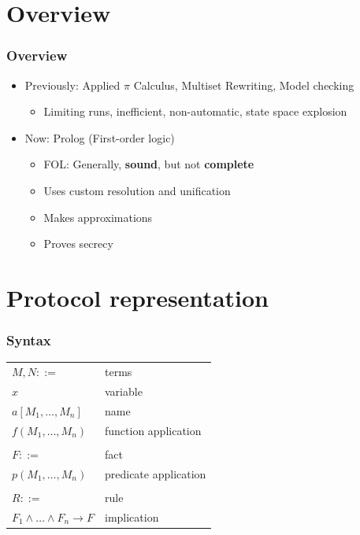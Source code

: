 \documentclass[10pt]{beamer}
\begin{document}
\section{Overview}

\begin{frame}
  \frametitle{Overview}
  \begin{itemize}
    \item Previously: Applied $\pi$ Calculus, Multiset Rewriting, Model checking
    \begin{itemize}
      \item Limiting runs, inefficient, non-automatic, state space explosion
    \end{itemize}
    \item Now: Prolog (First-order logic)
    \begin{itemize}
      \item FOL: Generally, \textbf{sound}, but not \textbf{complete}
      \item Uses custom resolution and unification
      \item Makes approximations
      \item Proves secrecy
    \end{itemize}
  \end{itemize}
\end{frame}

\section{Protocol representation}

\newcommand{\mytab}{\hspace{0.05\textwidth}}

\begin{frame}
  \frametitle{Syntax}
  \centering

  {\setlength{\tabcolsep}{20pt}
    \begin{tabular}{ll}
      $M, N ::=$ & terms \\
      \mytab$x$ & \mytab variable \\
      \mytab$a[M_1, \dots, M_n]$ & \mytab name \\
      \mytab$f(M_1, \dots, M_n)$ & \mytab function application \\\\

      $F ::=$ & fact \\
      \mytab$p(M_1, \dots, M_n)$ & \mytab predicate application \\\\

      $R ::=$ & rule \\
      \mytab$F_1 \land \dots \land F_n \rightarrow F$ & \mytab implication
    \end{tabular}
  }
\end{frame}
\end{document}
